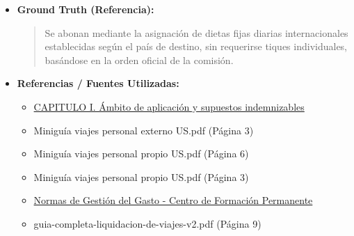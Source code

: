 \documentclass[12pt,a4paper,oneside]{report}
\begin{document}
\begin{itemize}
\begin{itemize}
\begin{quote}
\textbf{Artículos relevantes}:

\begin{itemize}
  \item Artículo 30 de la Instrucción 3/2025 (Indemnizaciones por desplazamiento)
  \item Artículo 40 de la Instrucción 3/2021 (Justificación)
\end{itemize}
                \end{quote}
          \item \textbf{{Ground Truth (Referencia):}} \\
                \begin{quote}
Se abonan mediante la asignación de dietas fijas diarias internacionales establecidas según el país de destino, sin requerirse tiques individuales, basándose en la orden oficial de la comisión.
                \end{quote}
          \item \textbf{{Referencias / Fuentes Utilizadas:}} \\
                \begin{itemize}
                  \item \href{https://www.us.es/sites/default/files/2022-04/05Instruccion3.pdf}{CAPITULO I. Ámbito de aplicación y supuestos indemnizables}
                  \item Miniguía viajes personal externo US.pdf (Página 3)
                  \item Miniguía viajes personal propio US.pdf (Página 6)
                  \item Miniguía viajes personal propio US.pdf (Página 3)
                  \item \href{https://cfp.us.es/profesores/normas-de-gestion/gestion-del-gasto}{Normas de Gestión del Gasto - Centro de Formación Permanente}
                  \item guia-completa-liquidacion-de-viajes-v2.pdf (Página 9)
                \end{itemize}
        \end{itemize}


\end{itemize}
\end{document}
